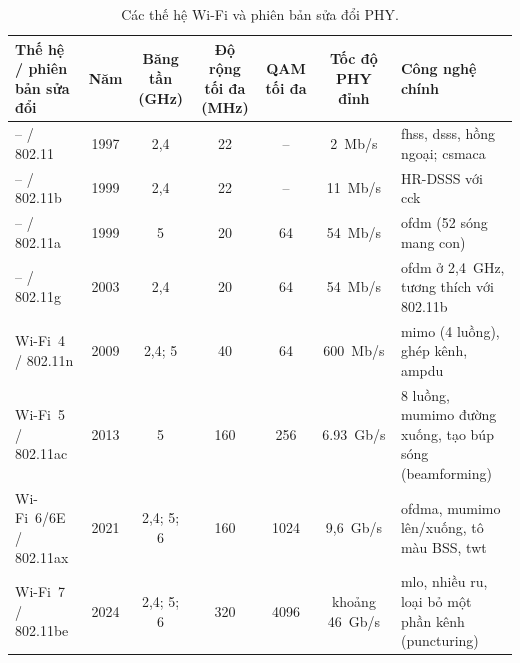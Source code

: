 \begin{table}[htbp]
  \centering\footnotesize
  \caption{Các thế hệ Wi-Fi và phiên bản sửa đổi PHY.}
  \label{tab:generations}
  \begin{tabularx}{\linewidth}{@{} L{1.1} C{0.4} C{0.6} C{0.5} C{0.4} C{0.8} L{2.2} @{}}
    \toprule
    \textbf{Thế hệ / phiên bản sửa đổi} & \textbf{Năm} & \textbf{Băng tần (GHz)} & \textbf{Độ rộng tối đa (MHz)} & \textbf{QAM tối đa} & \textbf{Tốc độ PHY đỉnh} & \textbf{Công nghệ chính} \\
    \midrule
    -- / 802.11                     & 1997          & 2,4                  & 22                       & --               & 2~Mb/s                 & \acs{fhss}, \acs{dsss}, hồng ngoại; \acs{csmaca} \\
    -- / 802.11b                    & 1999          & 2,4                  & 22                       & --               & 11~Mb/s                & HR-DSSS với \acs{cck} \\
    -- / 802.11a                    & 1999          & 5                    & 20                       & 64               & 54~Mb/s                & \acs{ofdm} (52 sóng mang con) \\
    -- / 802.11g                    & 2003          & 2,4                  & 20                       & 64               & 54~Mb/s                & \acs{ofdm} ở 2,4~GHz, tương thích với 802.11b \\
    Wi-Fi~4 / 802.11n               & 2009          & 2,4; 5               & 40                       & 64               & 600~Mb/s               & \acs{mimo} (4 luồng), ghép kênh, \acs{ampdu} \\
    Wi-Fi~5 / 802.11ac              & 2013          & 5                    & 160                      & 256              & 6.93~Gb/s              & 8 luồng, \acs{mumimo} đường xuống, tạo búp sóng (beamforming) \\
    Wi-Fi~6/6E / 802.11ax           & 2021          & 2,4; 5; 6            & 160                      & 1024             & 9,6~Gb/s               & \acs{ofdma}, \acs{mumimo} lên/xuống, tô màu BSS, \acs{twt} \\
    Wi-Fi~7 / 802.11be              & 2024          & 2,4; 5; 6            & 320                      & 4096             & khoảng 46~Gb/s         & \acs{mlo}, nhiều \acs{ru}, loại bỏ một phần kênh (puncturing) \\
    \bottomrule
  \end{tabularx}
\end{table}

